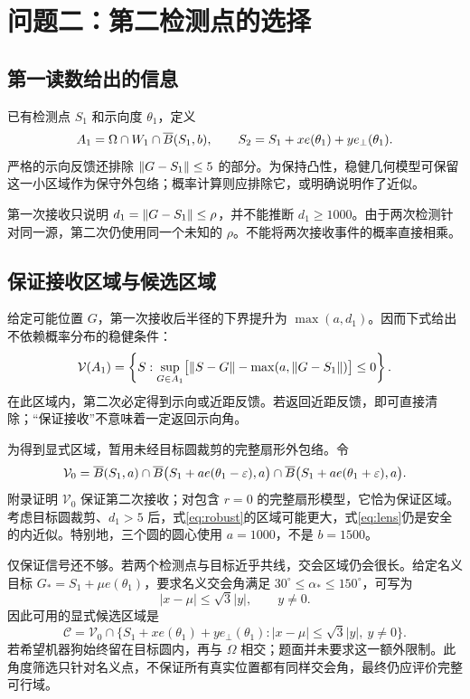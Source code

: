 \section{问题二：第二检测点的选择}
\subsection{第一读数给出的信息}
已有检测点 $S_1$ 和示向度 $\theta_1$，定义
\begin{equation}
A_1=\Omega\cap W_1\cap\overline B(S_1,b),\qquad
S_2=S_1+x e(\theta_1)+y e_\perp(\theta_1).
\end{equation}
严格的示向反馈还排除 $\left\lVert G-S_1\right\rVert\le5$ 的部分。为保持凸性，稳健几何模型可保留这一小区域作为保守外包络；概率计算则应排除它，或明确说明作了近似。

第一次接收只说明 $d_1=\left\lVert G-S_1\right\rVert\le\rho$，并不能推断 $d_1\ge1000$。由于两次检测针对同一源，第二次仍使用同一个未知的 $\rho$。不能将两次接收事件的概率直接相乘。

\subsection{保证接收区域与候选区域}
给定可能位置 $G$，第一次接收后半径的下界提升为 $\max(a,d_1)$。因而下式给出不依赖概率分布的稳健条件：
\begin{equation}
\mathcal V(A_1)=\left\{S:\sup_{G\in A_1}
\bigl[\left\lVert S-G\right\rVert-\max(a,\left\lVert G-S_1\right\rVert)\bigr]\le0\right\}.
\label{eq:robust}
\end{equation}
在此区域内，第二次必定得到示向或近距反馈。若返回近距反馈，即可直接清除；“保证接收”不意味着一定返回示向角。

为得到显式区域，暂用未经目标圆裁剪的完整扇形外包络。令
\begin{equation}
\mathcal V_0=\overline B(S_1,a)\cap
\overline B\bigl(S_1+a e(\theta_1-\varepsilon),a\bigr)\cap
\overline B\bigl(S_1+a e(\theta_1+\varepsilon),a\bigr).
\label{eq:lens}
\end{equation}
附录证明 $\mathcal V_0$ 保证第二次接收；对包含 $r=0$ 的完整扇形模型，它恰为保证区域。考虑目标圆裁剪、$d_1>5$ 后，式\eqref{eq:robust}的区域可能更大，式\eqref{eq:lens}仍是安全的内近似。特别地，三个圆的圆心使用 $a=1000$，不是 $b=1500$。

仅保证信号还不够。若两个检测点与目标近乎共线，交会区域仍会很长。给定名义目标 $G_*=S_1+\mu e(\theta_1)$，要求名义交会角满足 $30^\circ\le\alpha_*\le150^\circ$，可写为
\begin{equation}
|x-\mu|\le\sqrt3|y|,\qquad y\ne0.
\end{equation}
因此可用的显式候选区域是
\begin{equation}
\boxed{\mathcal C=\mathcal V_0\cap
\{S_1+x e(\theta_1)+y e_\perp(\theta_1):|x-\mu|\le\sqrt3|y|,\ y\ne0\}.}
\label{eq:candidates}
\end{equation}
若希望机器狗始终留在目标圆内，再与 $\Omega$ 相交；题面并未要求这一额外限制。此角度筛选只针对名义点，不保证所有真实位置都有同样交会角，最终仍应评价完整可行域。

